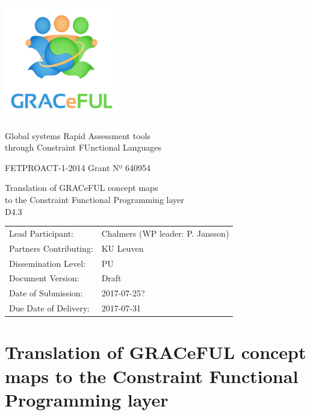 \documentclass{article}
\author{}
\date{}
\begin{document}
\begin{center}
\includegraphics[width=5cm]{../coverpage/GRACeFULlogo.png}

\textcolor{GRACeFULblue}{Global systems Rapid Assessment tools\\
through Constraint FUnctional Languages}

\vspace{1cm}

FETPROACT-1-2014 Grant Nº 640954

\end{center}

\begin{framed}
\begin{center}
\Large
Translation of GRACeFUL concept maps\\
to the Constraint Functional Programming layer\\[1ex]

D4.3\\[1ex]

\end{center}
\end{framed}

\vspace{1cm}

\noindent
\begin{tabular}{@{}ll@{}}
  Lead Participant:       & Chalmers (WP leader: P. Jansson)
\\Partners Contributing:  & KU Leuven
\\Dissemination Level:    & PU
\\Document Version:       & Draft
\\Date of Submission:     & 2017-07-25?
\\Due Date of Delivery:   & 2017-07-31
\end{tabular}

\newpage

\section*{Translation of GRACeFUL concept maps to the Constraint Functional Programming layer}\label{DSL4GRACeFUL}
\end{document}
